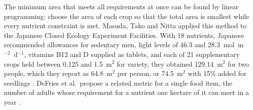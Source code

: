 The minimum area that meets all requirements at once can be found by linear programming: choose the area of each crop so that the total area is smallest while every nutrient constraint is met. Masuda, Tako and Nitta applied this method to the Japanese Closed Ecology Experiment Facilities. With 18 nutrients, Japanese recommended allowances for sedentary men, light levels of 46.3 and 28.3~mol~m$^{-2}$~d$^{-1}$, vitamins B12 and D supplied as tablets, and each of 21 supplementary crops held between 0.125 and 1.5~m$^2$ for variety, they obtained 129.14~m$^2$ for two people, which they report as 64.8~m$^2$ per person, or 74.5~m$^2$ with 15\% added for seedlings \cite[pp.~62--64]{masuda2005ceef}. DeFries et al.\ propose a related metric for a single food item, the number of adults whose requirement for a nutrient one hectare of it can meet in a year \cite[p.~240]{defries2015metrics}.

